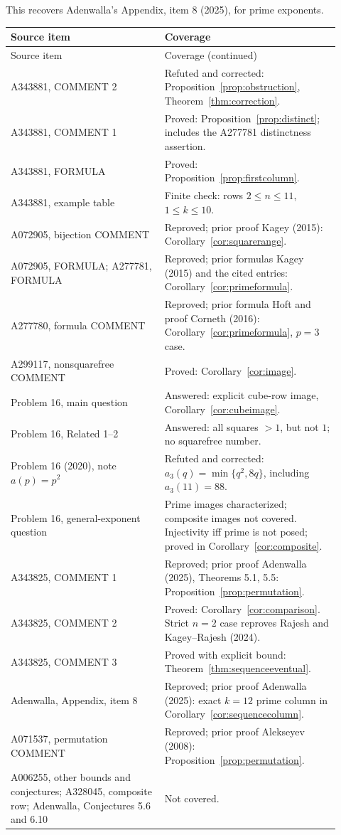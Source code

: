\documentclass[11pt]{article}
\begin{document}
This recovers Adenwalla's Appendix, item 8 (2025), for prime exponents.

\small
\begin{longtable}{@{}>{\raggedright\arraybackslash}p{0.43\linewidth}>{\raggedright\arraybackslash}p{0.49\linewidth}@{}}
\toprule
Source item & Coverage \\
\midrule
\endfirsthead
\toprule
Source item & Coverage (continued) \\
\midrule
\endhead
A343881, COMMENT 2 & Refuted and corrected: Proposition~\ref{prop:obstruction},
Theorem~\ref{thm:correction}. \\
A343881, COMMENT 1 & Proved: Proposition~\ref{prop:distinct}; includes
the A277781 distinctness assertion. \\
A343881, FORMULA & Proved: Proposition~\ref{prop:firstcolumn}. \\
A343881, example table & Finite check: rows $2\le n\le11$, $1\le k\le10$. \\
A072905, bijection COMMENT & Reproved; prior proof Kagey (2015):
Corollary~\ref{cor:squarerange}. \\
A072905, FORMULA; A277781, FORMULA & Reproved; prior formulas
Kagey (2015) and the cited entries: Corollary~\ref{cor:primeformula}. \\
A277780, formula COMMENT & Reproved; prior formula Hoft and proof
Corneth (2016): Corollary~\ref{cor:primeformula}, $p=3$ case. \\
A299117, nonsquarefree COMMENT & Proved:
Corollary~\ref{cor:image}. \\
Problem 16, main question & Answered: explicit cube-row image,
Corollary~\ref{cor:cubeimage}. \\
Problem 16, Related 1--2 & Answered: all squares $>1$, but not $1$;
no squarefree number. \\
Problem 16 (2020), note $a(p)=p^2$ & Refuted and corrected:
$a_3(q)=\min\{q^2,8q\}$, including $a_3(11)=88$. \\
Problem 16, general-exponent question & Prime images characterized;
composite images not covered. Injectivity iff prime is not posed;
proved in Corollary~\ref{cor:composite}. \\
A343825, COMMENT 1 & Reproved; prior proof Adenwalla (2025),
Theorems 5.1, 5.5: Proposition~\ref{prop:permutation}. \\
A343825, COMMENT 2 & Proved: Corollary~\ref{cor:comparison}.
Strict $n=2$ case reproves Rajesh and Kagey--Rajesh (2024). \\
A343825, COMMENT 3 & Proved with explicit bound:
Theorem~\ref{thm:sequenceeventual}. \\
Adenwalla, Appendix, item 8 & Reproved; prior proof Adenwalla (2025):
exact $k=12$ prime column in Corollary~\ref{cor:sequencecolumn}. \\
A071537, permutation COMMENT & Reproved; prior proof Alekseyev (2008):
Proposition~\ref{prop:permutation}. \\
A006255, other bounds and conjectures; A328045, composite row;
Adenwalla, Conjectures 5.6 and 6.10 & Not covered. \\
\bottomrule
\end{longtable}
\normalsize
\end{document}
